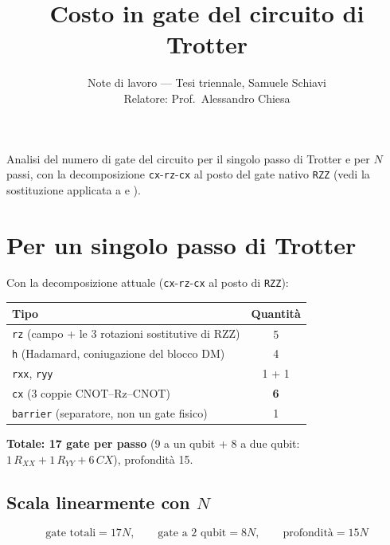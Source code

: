 \documentclass[11pt,a4paper]{article}
\title{\vspace{-1.5em}\color{inkblue}Costo in gate del circuito di Trotter}
\author{Note di lavoro --- Tesi triennale, Samuele Schiavi\\ Relatore: Prof.\ Alessandro Chiesa}
\date{}
\begin{document}
\sloppy
\maketitle
\thispagestyle{fancy}
\vspace{-2em}

Analisi del numero di gate del circuito per il singolo passo di Trotter
e per $N$ passi, con la decomposizione \texttt{cx}-\texttt{rz}-\texttt{cx}
al posto del gate nativo \texttt{RZZ} (vedi la sostituzione applicata a
\texttt{}
e \texttt{}).

\section{Per un singolo passo di Trotter}

Con la decomposizione attuale (\texttt{cx}-\texttt{rz}-\texttt{cx} al
posto di \texttt{RZZ}):

\begin{center}
\renewcommand{\arraystretch}{1.25}
\begin{tabular}{@{}lc@{}}
\toprule
\rowcolor{inkblue!10}
\textbf{Tipo} & \textbf{Quantità}\\
\midrule
\texttt{rz} (campo + le 3 rotazioni sostitutive di RZZ) & 5\\
\texttt{h} (Hadamard, coniugazione del blocco DM) & 4\\
\texttt{rxx}, \texttt{ryy} & 1 + 1\\
\texttt{cx} (3 coppie CNOT--Rz--CNOT) & \textbf{6}\\
\texttt{barrier} (separatore, non un gate fisico) & 1\\
\bottomrule
\end{tabular}
\end{center}

\begin{keyeq}
\centering
\textbf{Totale: 17 gate per passo} (9 a un qubit + 8 a due qubit:
$1\,R_{XX}+1\,R_{YY}+6\,CX$), profondità 15.
\end{keyeq}

\subsection*{Scala linearmente con $N$}

$$\text{gate totali} = 17N, \qquad \text{gate a 2 qubit} = 8N, \qquad \text{profondità} = 15N$$
\end{document}
